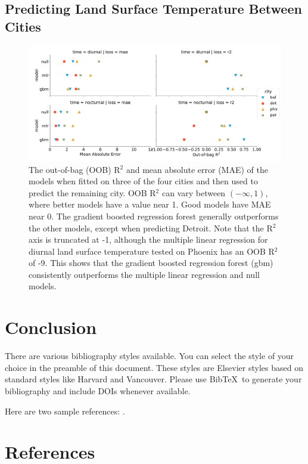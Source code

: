 \documentclass[]{elsarticle}
\begin{document}
\subsection{Predicting Land Surface Temperature Between Cities}

\begin{figure}[h]
\begin{center}
\includegraphics[width=\textwidth]{fig/report/cities_holdout.pdf}
\caption{The out-of-bag (OOB) R$^2$ and mean absolute error (MAE) of the models when fitted on three of the four cities and then used to predict the remaining city. OOB R$^2$ can vary between $(-\infty, 1)$, where better models have a value near 1. Good models have MAE near 0. The gradient boosted regression forest generally outperforms the other models, except when predicting Detroit. Note that the R$^2$ axis is truncated at -1, although the multiple linear regression for diurnal land surface temperature tested on Phoenix has an OOB R$^2$ of -9.  This shows that the gradient boosted regression forest (gbm) consistently outperforms the multiple linear regression and null models.}
\label{fig:cityholdout_errors}
\end{center}
\end{figure}


\section{Conclusion}

There are various bibliography styles available. You can select the style of your choice in the preamble of this document. These styles are Elsevier styles based on standard styles like Harvard and Vancouver. Please use Bib\TeX\ to generate your bibliography and include DOIs whenever available.

Here are two sample references: \cite{Feynman1963118,Dirac1953888}.

\section*{References}
\end{document}
